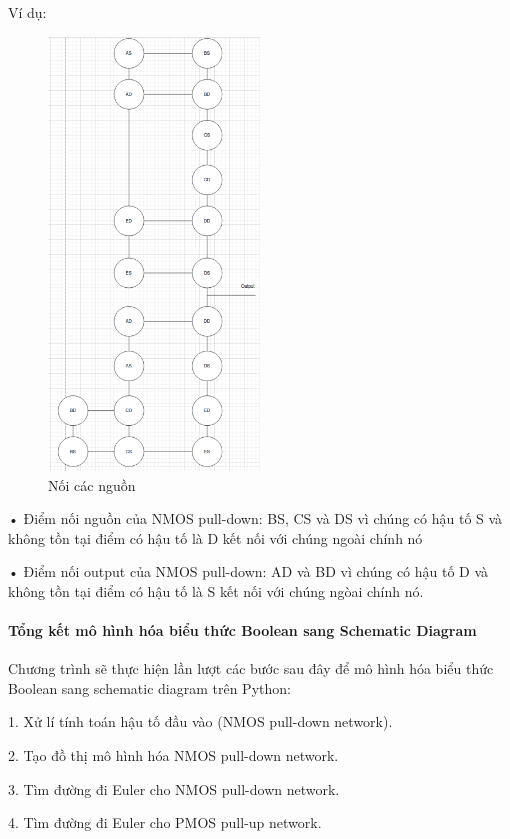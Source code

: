 \documentclass[a4paper,12pt]{article}
\begin{document}
Ví dụ: 

\begin{figure}[H]
    \centering  
    \includegraphics[width=0.5\textwidth]{../PNG/NoiNguon.png}
    \caption{Nối các nguồn}
    \label{fig:ConnectSource}
\end{figure}

• Điểm nối nguồn của NMOS pull-down: BS, CS và DS vì chúng có hậu tố S và không tồn tại điểm
có hậu tố là D kết nối với chúng ngoài chính nó

• Điểm nối output của NMOS pull-down: AD và BD vì chúng có hậu tố D và không tồn tại
điểm có hậu tố là S kết nối với chúng ngòai chính nó.
\paragraph{Tổng kết mô hình hóa biểu thức Boolean sang Schematic Diagram}
Chương trình sẽ thực hiện lần lượt các bước sau đây để mô hình hóa biểu thức
Boolean sang schematic diagram trên Python:

1. Xử lí tính toán hậu tố đầu vào (NMOS pull-down network).

2. Tạo đồ thị mô hình hóa NMOS pull-down network.

3. Tìm đường đi Euler cho NMOS pull-down network.

4. Tìm đường đi Euler cho PMOS pull-up network.
\end{document}
